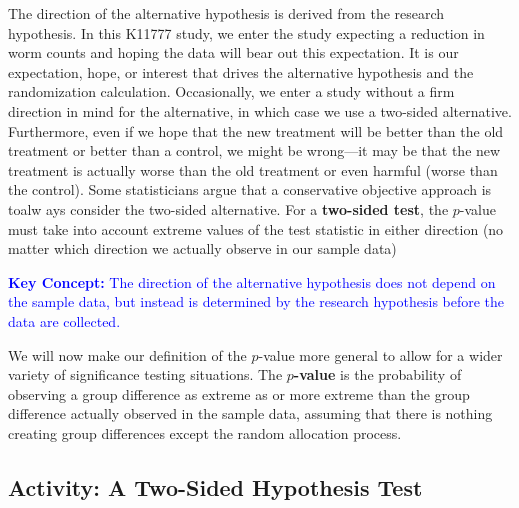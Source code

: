 \documentclass[
]{book}
\begin{document}
The direction of the alternative hypothesis is derived from the research hypothesis. In this K11777 study, we enter the study expecting a reduction in worm counts and hoping the data will bear out this expectation. It is our expectation, hope, or interest that drives the alternative hypothesis and the randomization calculation. Occasionally, we enter a study without a firm direction in mind for the alternative, in which case we use a two-sided alternative. Furthermore, even if we hope that the new treatment will be better than the old treatment or better than a control, we might be wrong---it may be that the new treatment is actually worse than the old treatment or even harmful (worse than the control). Some statisticians argue that a conservative objective approach is toalw ays consider the two-sided alternative. For a \textbf{two-sided test}, the \(p\)-value must take into account extreme values of the test statistic in either direction (no matter which direction we actually observe in our sample data)

\textbf{\textcolor{blue}{Key Concept:}}
\textcolor{blue}{The direction of the alternative hypothesis does not depend on the sample data, but instead is determined by the research hypothesis before the data are collected.}

We will now make our definition of the \(p\)-value more general to allow for a wider variety of significance testing situations. The \textbf{\(p\)-value} is the probability of observing a group difference as extreme as or more extreme than the group difference actually observed in the sample data, assuming that there is nothing creating group
differences except the random allocation process.

\hypertarget{activity-a-two-sided-hypothesis-test}{%
\subsection*{Activity: A Two-Sided Hypothesis Test}\label{activity-a-two-sided-hypothesis-test}}
\end{document}

